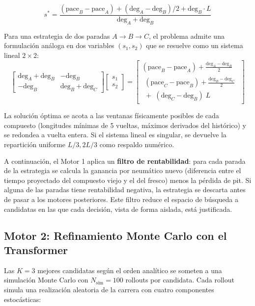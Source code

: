 \begin{equation}
    s^{*} = \frac{(\text{pace}_B - \text{pace}_A) + (\text{deg}_A - \text{deg}_B)/2 + \text{deg}_B \cdot L}{\text{deg}_A + \text{deg}_B}
    \label{eq:break_even_1stop}
\end{equation}

Para una estrategia de dos paradas $A \to B \to C$, el problema admite una formulación análoga en dos variables $(s_1, s_2)$ que se resuelve como un sistema lineal $2 \times 2$:
\begin{equation}
    \begin{bmatrix}
        \text{deg}_A + \text{deg}_B & -\text{deg}_B \\
        -\text{deg}_B & \text{deg}_B + \text{deg}_C
    \end{bmatrix}
    \begin{bmatrix} s_1 \\
    s_2 \end{bmatrix}
    =
    \begin{bmatrix}
        (\text{pace}_B - \text{pace}_A) + \frac{\text{deg}_A - \text{deg}_B}{2} \\
        \begin{array}{l}
            (\text{pace}_C - \text{pace}_B) + \frac{\text{deg}_B - \text{deg}_C}{2} \\
            {}+\; (\text{deg}_C - \text{deg}_B)\; L
        \end{array}
    \end{bmatrix}
    \label{eq:break_even_2stop}
\end{equation}

La solución óptima se acota a las ventanas físicamente posibles de cada compuesto (longitudes mínimas de 5 vueltas, máximos derivados del histórico) y se redondea a vuelta entera. Si el sistema lineal es singular, se devuelve la repartición uniforme $L/3, 2L/3$ como respaldo numérico.

A continuación, el Motor 1 aplica un \textbf{filtro de rentabilidad}: para cada parada de la estrategia se calcula la ganancia por neumático nuevo (diferencia entre el tiempo proyectado del compuesto viejo y el del fresco) menos la pérdida de pit. Si alguna de las paradas tiene rentabilidad negativa, la estrategia se descarta antes de pasar a los motores posteriores. Este filtro reduce el espacio de búsqueda a candidatas en las que cada decisión, vista de forma aislada, está justificada.

\subsection{Motor 2: Refinamiento Monte Carlo con el Transformer}
\label{ssec:motor2}
Las $K = 3$ mejores candidatas según el orden analítico se someten a una simulación Monte Carlo con $N_\text{sim} = 100$ rollouts por candidata. Cada rollout simula una realización aleatoria de la carrera con cuatro componentes estocásticas:

